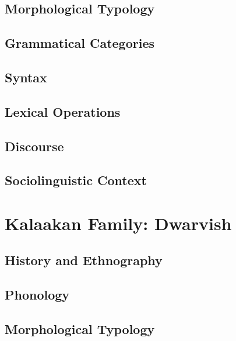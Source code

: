 \documentclass[12pt,letterpaper,openany,twoside]{memoir}
\let\originalpart=\part
\def\part{\cleardoublepage\originalpart}
\begin{document}
\chapter{Morphological Typology}

\chapter{Grammatical Categories}

\chapter{Syntax}

\chapter{Lexical Operations}

\chapter{Discourse}

\chapter{Sociolinguistic Context}

\part{Kalaakan Family: Dwarvish}

\chapter{History and Ethnography}

\chapter{Phonology}

\chapter{Morphological Typology}
\end{document}
